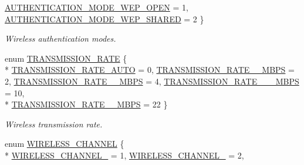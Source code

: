 \begin{DoxyCompactItemize}
\hyperlink{group__wireless__interface_ggab857a286e4eb7fe1039f12ab48d4a3bea6235902d5456c0b77ad0264d745cd055}{A\+U\+T\+H\+E\+N\+T\+I\+C\+A\+T\+I\+O\+N\+\_\+\+M\+O\+D\+E\+\_\+\+W\+E\+P\+\_\+\+O\+P\+EN} = 1, 
\hyperlink{group__wireless__interface_ggab857a286e4eb7fe1039f12ab48d4a3bea95b2ac8fca2c44c17323a607c28c36a3}{A\+U\+T\+H\+E\+N\+T\+I\+C\+A\+T\+I\+O\+N\+\_\+\+M\+O\+D\+E\+\_\+\+W\+E\+P\+\_\+\+S\+H\+A\+R\+ED} = 2
 \}\begin{DoxyCompactList}\small\item\em Wireless authentication modes. \end{DoxyCompactList}
\item 
enum \hyperlink{group__wireless__interface_ga5fe34de02ca1d34a33910a3c1cadab18}{T\+R\+A\+N\+S\+M\+I\+S\+S\+I\+O\+N\+\_\+\+R\+A\+TE} \{ \\*
\hyperlink{group__wireless__interface_gga5fe34de02ca1d34a33910a3c1cadab18ac61673af65d119f75d2acde9fc760265}{T\+R\+A\+N\+S\+M\+I\+S\+S\+I\+O\+N\+\_\+\+R\+A\+T\+E\+\_\+\+A\+U\+TO} = 0, 
\hyperlink{group__wireless__interface_gga5fe34de02ca1d34a33910a3c1cadab18ad696f5c16615369f1eea78f57976434e}{T\+R\+A\+N\+S\+M\+I\+S\+S\+I\+O\+N\+\_\+\+R\+A\+T\+E\+\_\+\_\+\+M\+B\+PS} = 2, 
\hyperlink{group__wireless__interface_gga5fe34de02ca1d34a33910a3c1cadab18a1e9bd6946cd2d398d98dc749d9a4320e}{T\+R\+A\+N\+S\+M\+I\+S\+S\+I\+O\+N\+\_\+\+R\+A\+T\+E\+\_\+\_\+\+M\+B\+PS} = 4, 
\hyperlink{group__wireless__interface_gga5fe34de02ca1d34a33910a3c1cadab18a69cbfb07b554371adc5ed5662d38826b}{T\+R\+A\+N\+S\+M\+I\+S\+S\+I\+O\+N\+\_\+\+R\+A\+T\+E\+\_\+\_\+\_\+\+M\+B\+PS} = 10, 
\\*
\hyperlink{group__wireless__interface_gga5fe34de02ca1d34a33910a3c1cadab18aed82925b6d110806c9f704607ea2f9ce}{T\+R\+A\+N\+S\+M\+I\+S\+S\+I\+O\+N\+\_\+\+R\+A\+T\+E\+\_\+\_\+\+M\+B\+PS} = 22
 \}\begin{DoxyCompactList}\small\item\em Wireless transmission rate. \end{DoxyCompactList}
\item 
enum \hyperlink{group__wireless__interface_ga5d523cadfff48b2f9feb3e16491ce04f}{W\+I\+R\+E\+L\+E\+S\+S\+\_\+\+C\+H\+A\+N\+N\+EL} \{ \\*
\hyperlink{group__wireless__interface_gga5d523cadfff48b2f9feb3e16491ce04fa5c6df36b24055654b6ada9b79d3843fc}{W\+I\+R\+E\+L\+E\+S\+S\+\_\+\+C\+H\+A\+N\+N\+E\+L\+\_} = 1, 
\hyperlink{group__wireless__interface_gga5d523cadfff48b2f9feb3e16491ce04fa22c16eea9f77aae89eec9147683720ba}{W\+I\+R\+E\+L\+E\+S\+S\+\_\+\+C\+H\+A\+N\+N\+E\+L\+\_} = 2, 

\end{DoxyCompactItemize}
